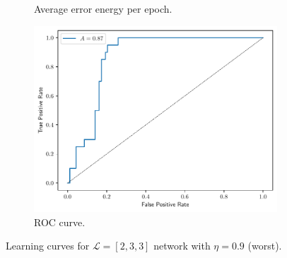 \documentclass[conference]{IEEEtran}
\theoremstyle{definition}
\theoremstyle{remark}
\theoremstyle{remark}
\begin{document}
\begin{figure}
\begin{subfigure}[b]{0.3\textwidth}
    \caption{Average error energy per epoch.}
  \end{subfigure}
  \begin{subfigure}[b]{0.3\textwidth}
    \centering \includegraphics[width=\textwidth]{figs/2-3-3-0.9-emb-roc.pdf}
    \caption{ROC curve.}
  \end{subfigure}
  \caption{Learning curves for $\mathcal{L}=[2,3,3]$ network with $\eta=0.9$
    (worst).}
\end{figure}
\end{document}
